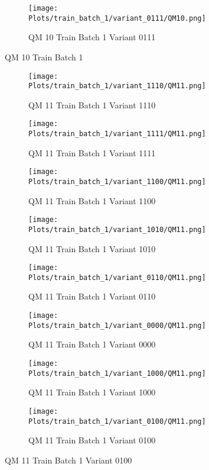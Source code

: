 \documentclass{DissertateFigs}
\begin{document}
\begin{figure}[t!]
\medskip

    \begin{subfigure}{0.47\textwidth}
    \texttt{[image: Plots/train\_batch\_1/variant\_0111/QM10.png]}
    \caption{QM 10 Train Batch 1 Variant 0111}
    \end{subfigure}
\caption{QM 10 Train Batch 1}
    \end{figure}
\clearpage
\begin{figure}[t!]
    \begin{subfigure}{0.47\textwidth}
    \texttt{[image: Plots/train\_batch\_1/variant\_1110/QM11.png]}
    \caption{QM 11 Train Batch 1 Variant 1110}
    \end{subfigure}
    \begin{subfigure}{0.47\textwidth}
    \texttt{[image: Plots/train\_batch\_1/variant\_1111/QM11.png]}
    \caption{QM 11 Train Batch 1 Variant 1111}
    \end{subfigure}

\medskip

    \begin{subfigure}{0.47\textwidth}
    \texttt{[image: Plots/train\_batch\_1/variant\_1100/QM11.png]}
    \caption{QM 11 Train Batch 1 Variant 1100}
    \end{subfigure}
    \begin{subfigure}{0.47\textwidth}
    \texttt{[image: Plots/train\_batch\_1/variant\_1010/QM11.png]}
    \caption{QM 11 Train Batch 1 Variant 1010}
    \end{subfigure}

\medskip

    \begin{subfigure}{0.47\textwidth}
    \texttt{[image: Plots/train\_batch\_1/variant\_0110/QM11.png]}
    \caption{QM 11 Train Batch 1 Variant 0110}
    \end{subfigure}
    \begin{subfigure}{0.47\textwidth}
    \texttt{[image: Plots/train\_batch\_1/variant\_0000/QM11.png]}
    \caption{QM 11 Train Batch 1 Variant 0000}
    \end{subfigure}

\medskip

    \begin{subfigure}{0.47\textwidth}
    \texttt{[image: Plots/train\_batch\_1/variant\_1000/QM11.png]}
    \caption{QM 11 Train Batch 1 Variant 1000}
    \end{subfigure}
    \begin{subfigure}{0.47\textwidth}
    \texttt{[image: Plots/train\_batch\_1/variant\_0100/QM11.png]}
    \caption{QM 11 Train Batch 1 Variant 0100}
    \end{subfigure}


\end{figure}
\end{document}
